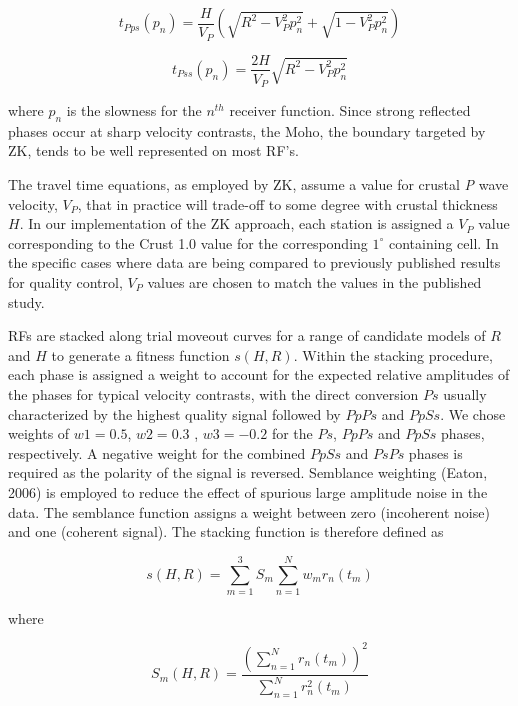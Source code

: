 \documentclass[review]{elsarticle}
\begin{document}
\begin{equation}
t_{Pps}(p_n) = \frac{H}{V_P} \left( \sqrt{ R^2 - V_P^2p_n^2} + \sqrt{1 - V_P^2p_n^2} \right)
\end{equation}

\begin{equation}
t_{Pss}(p_n)= \frac{2H}{V_P} \sqrt{ R^2 - V_P^2p_n^2}
\end{equation}

\noindent where $p_n$ is the slowness for the $n^{th}$ receiver function. Since strong reflected phases occur at sharp velocity contrasts, the Moho, the boundary targeted by ZK, tends to be well represented on most RF's.

The travel time equations, as employed by ZK, assume a value for crustal {\it P} wave velocity, $V_P$, that in practice will trade-off to some degree with crustal thickness $H$. In our implementation of the ZK approach, each station is assigned a $V_P$ value corresponding to the Crust 1.0 value for the corresponding $1^\circ$ containing cell. In the specific cases where data are being compared to previously published results for quality control, $V_P$  values are chosen to match the values in the published study.

RFs are stacked along trial moveout curves for a range of candidate models of $R$ and $H$ to generate a fitness function $s(H,R)$.  Within the stacking procedure, each phase is assigned a weight to account for the expected relative amplitudes of the phases for typical velocity contrasts, with the direct conversion $Ps$ usually characterized by the highest quality signal followed by $PpPs$ and $PpSs$. We chose weights of $w1 = 0.5$, $w2 = 0.3$ , $w3 = -0.2$ for the $Ps$, $PpPs$ and $PpSs$ phases, respectively. A negative weight for the combined $PpSs$ and $PsPs$ phases is required as the polarity of the signal is reversed. Semblance weighting (Eaton, 2006) is employed to reduce the effect of spurious large amplitude noise in the data. The semblance function assigns a weight between zero (incoherent noise) and one (coherent signal). The stacking function is therefore defined as

\begin{equation}  \label{eq:stack}
s(H,R) = \sum_{m=1}^{3} S_m \sum_{n=1}^N w_mr_n(t_m)
\end{equation}

\noindent where

\begin{equation}
S_m(H,R) = \frac {\left( \sum_{n=1}^N r_n(t_m) \right)^2}
                 { \sum_{n=1}^N r_n^2(t_m) }
\end{equation}
\end{document}
